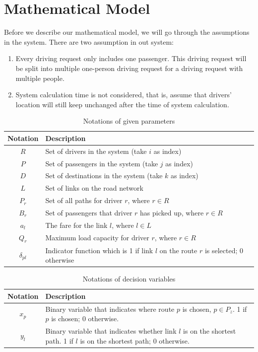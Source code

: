 \section{Mathematical Model}

Before we describe our mathematical model, we will go through the assumptions in the system. There are two assumption in out system:

\begin{enumerate}
  \item Every driving request only includes one passenger. This driving request will be split into multiple one-person driving request for a driving request with multiple people.
  \item System calculation time is not considered, that is, assume that drivers' location will still keep unchanged after the time of system calculation.
 \end{enumerate}

\renewcommand\arraystretch{1.5}
\par
\begin{table}[ht]
  \centering
  \caption{Notations of given parameters}
  \begin{tabularx}{\textwidth}{cX}
  \toprule
  Notation & Description \\
  \midrule
    $R$ & Set of drivers in the system (take $i$ as index) \\
    $P$ & Set of passengers in the system (take $j$ as index) \\
    $D$ & Set of destinations in the system (take $k$ as index) \\
    $L$ & Set of links on the road network \\
    $P_r$ & Set of all paths for driver $r$, where $r \in R$ \\
    $B_r$ & Set of passengers that driver $r$ has picked up, where $r \in R$ \\
    $a_l$ & The fare for the link $l$, where $l \in L$ \\
    $Q_r$ & Maximum load capacity for driver $r$, where $r \in R$ \\
    $\delta_{pl}$ & Indicator function which is 1 if link $l$ on the route $r$ is selected; 0 otherwise \\
  \bottomrule
  \end{tabularx}
\end{table}  
\par

\begin{table}[ht]
  \centering
  \caption{Notations of decision variables}
  \begin{tabularx}{\textwidth}{cX}
  \toprule
  Notation & Description \\
  \midrule
  $x_p$ & Binary variable that indicates where route $p$ is chosen, $p \in P_z$. 1 if $p$ is chosen; 0 otherwise. \\
  $y_l$ & Binary variable that indicates whether link $l$ is on the shortest path. 1 if $l$ is on the shortest path; 0 otherwise. \\
  \bottomrule
  \end{tabularx}
\end{table}  
\newpage


